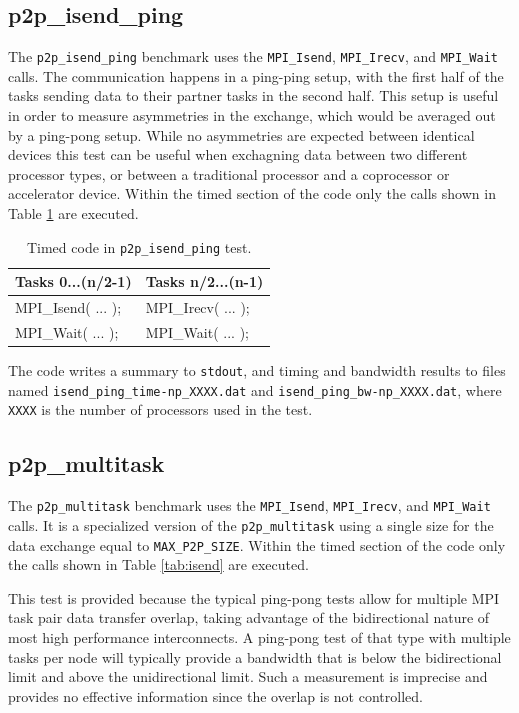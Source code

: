 \documentclass[10pt,a4paper]{report}
\begin{document}
\FloatBarrier
\subsection{p2p\_isend\_ping}
The \verb+p2p_isend_ping+ benchmark uses the \verb+MPI_Isend+, \verb+MPI_Irecv+, and \verb+MPI_Wait+ calls. The communication happens in a ping-ping setup, with the first half of the tasks sending data to their partner tasks in the second half. This setup is useful in order to measure asymmetries in the exchange, which would be averaged out by a ping-pong setup. While no asymmetries are expected between identical devices this test can be useful when exchagning data between two different processor types, or between a traditional processor and a coprocessor or accelerator device. Within the timed section of the code only the calls shown in Table \ref{tab:ping} are executed.

\begin{table}[ht]
\centering
\caption{Timed code in \texttt{p2p\_isend\_ping} test.}
\label{tab:ping}
\begin{tabular}{|l|l|}
\hline
\bf{Tasks 0...(n/2-1)}	& \bf{Tasks n/2...(n-1)}\\\hline
MPI\_Isend( ... );      & MPI\_Irecv( ... );\\
MPI\_Wait( ... );       & MPI\_Wait( ... );\\\hline
\end{tabular}
\end{table}

The code writes a summary to \verb+stdout+, and timing and bandwidth results to files named \verb+isend_ping_time-np_XXXX.dat+ and \verb+isend_ping_bw-np_XXXX.dat+, where \verb+XXXX+ is the number of processors used in the test.

\subsection{p2p\_multitask}
The \verb+p2p_multitask+ benchmark uses the \verb+MPI_Isend+, \verb+MPI_Irecv+, and \verb+MPI_Wait+ calls. It is a specialized version of the \verb+p2p_multitask+ using a single size for the data exchange equal to \verb+MAX_P2P_SIZE+. Within the timed section of the code only the calls shown in Table \ref{tab:isend} are executed. 

This test is provided because the typical ping-pong tests allow for multiple MPI task pair data transfer overlap, taking advantage of the bidirectional nature of most high performance interconnects. A ping-pong test of that type with multiple tasks per node will typically provide a bandwidth that is below the bidirectional limit and above the unidirectional limit. Such a measurement is imprecise and provides no effective information since the overlap is not controlled. 
\end{document}
